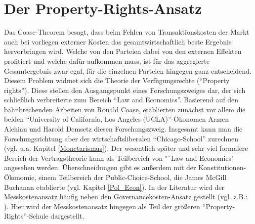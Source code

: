\section{Der Property-Rights-Ansatz}
\label{sec: Property Rights}

Das Coase-Theorem besagt, dass beim Fehlen von Transaktionskosten der Markt auch bei vorliegen externer Kosten das gesamtwirtschaftlich beste Ergebnis hervorbringen wird. Welche von den Parteien dabei von den externen Effekten profitiert und welche dafür aufkommen muss, ist für das aggregierte Gesamtergebnis zwar egal, für die einzelnen Parteien hingegen ganz entscheidend. Diesem Problem widmet sich die Theorie der Verfügungsrechte ("`Property rights"'). Diese stellen den Ausgangspunkt eines Forschungszweiges dar, der sich schließlich verbreiterte zum Bereich "`Law and Economics"'. Basierend auf den bahnbrechenden Arbeiten von Ronald Coase, etablierten zunächst vor allem die beiden "`University of California, Los Angeles (UCLA)"'-Ökonomen Armen Alchian und Harold Demsetz diesen Forschungszweig. Insgesamt kann man die Forschungsrichtung aber der wirtschaftsliberalen "`Chicago-School"' zurechnen (vgl. u.a. Kapitel \ref{Monetarismus}). Der wesentlich später und sehr viel formalere Bereich der Vertragstheorie kann als Teilbereich von "`Law and Economics" angesehen werden. Überschneidungen gibt es außerdem mit der Konstitutionen-Ökonomie, einem Teilbereich der Public-Choice-School, die James McGill Buchanan etablierte (vgl. Kapitel \ref{Pol_Econ}). In der Literatur wird der Messkostenansatz häufig neben den Governancekosten-Ansatz gestellt (vgl. z.B.: \parencite[S. 40]{Erlei2016}). Hier wird der Messkostenansatz hingegen als Teil der größeren "`Property-Rights"'-Schule dargestellt.

